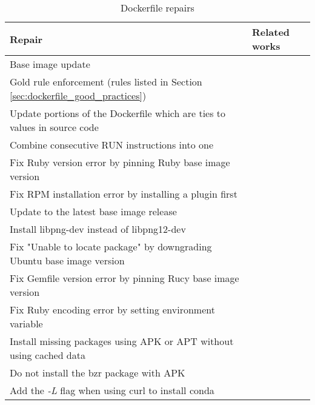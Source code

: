 \begin{table}[H]
    \centering
    \begin{tabular}{|p{}|p{}|}
        \hline \textbf{Repair} & \textbf{Related works} \\
        \hline Base image update & \cite{kitajimaLatestImageRecommendation2020} \\
        \hline Gold rule enforcement (rules listed in Section \ref{sec:dockerfile_good_practices}) & \cite{henkelLearningUnderstandingSupporting2020} \\
        \hline Update portions of the Dockerfile which are ties to values in source code & \cite{hassanRUDSEARecommendingUpdates2018} \\
        \hline Combine consecutive RUN instructions into one & \cite{benniSupportingMicroservicesDeployment2018} \\
        \hline Fix Ruby version error by pinning Ruby base image version & \cite{henkelShipwrightHumanintheLoopSystem2021} \\
        \hline Fix RPM installation error by installing a plugin first & \cite{henkelShipwrightHumanintheLoopSystem2021} \\
        \hline Update to the latest base image release & \cite{henkelShipwrightHumanintheLoopSystem2021} \\
        \hline Install libpng-dev instead of libpng12-dev & \cite{henkelShipwrightHumanintheLoopSystem2021} \\
        \hline Fix "Unable to locate package" by downgrading Ubuntu base image version & \cite{henkelShipwrightHumanintheLoopSystem2021} \\
        \hline Fix Gemfile version error by pinning Rucy base image version & \cite{henkelShipwrightHumanintheLoopSystem2021} \\
        \hline Fix Ruby encoding error by setting environment variable & \cite{henkelShipwrightHumanintheLoopSystem2021} \\
        \hline Install missing packages using APK or APT without using cached data & \cite{henkelShipwrightHumanintheLoopSystem2021} \\
        \hline Do not install the bzr package with APK & \cite{henkelShipwrightHumanintheLoopSystem2021} \\
        \hline Add the \textit{-L} flag when using curl to install conda & \cite{henkelShipwrightHumanintheLoopSystem2021} \\
        \hline
    \end{tabular}
    \caption{Dockerfile repairs}
    \label{tab:dockerfile_repair}
\end{table}

